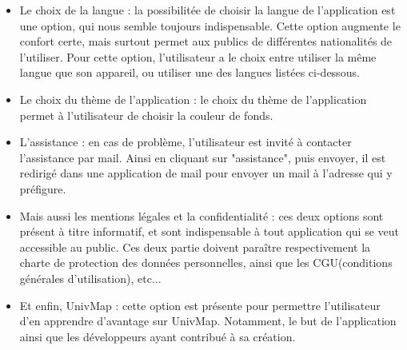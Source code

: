 \documentclass{article}
\begin{document}
\begin{itemize}
    \item Le choix de la langue : la possibilitée de choisir la langue de l'application est une option, qui nous semble toujours indispensable.
    Cette option augmente le confort certe, mais surtout permet aux publics de différentes nationalités de l'utiliser.
    Pour cette option, l'utilisateur a le choix entre utiliser la même langue que son appareil, ou utiliser une des langues listées ci-dessous.   

    \item Le choix du thème de l'application : le choix du thème de l'application permet à l'utilisateur de choisir la couleur de fonds.
    
    \item L'assistance : en cas de problème, l'utilisateur est invité à contacter l'assistance par mail. Ainsi en cliquant sur "assistance",
    puis envoyer, il est redirigé dans une application de mail pour envoyer un mail à l'adresse qui y préfigure. 
    
    \item Mais aussi les mentions légales et la confidentialité : ces deux options sont présent à titre informatif, et sont indispensable à tout
    application qui se veut accessible au public. Ces deux partie doivent paraître respectivement la charte de protection des données personnelles,
    ainsi que les CGU(conditions générales d'utilisation), etc...
    
    \item Et enfin, UnivMap : cette option est présente pour permettre l'utilisateur d'en apprendre d'avantage sur UnivMap. Notamment,
    le but de l'application ainsi que les développeurs ayant contribué à sa création.
    
\end{itemize}

\vspace{10pt}   %
\end{document}
